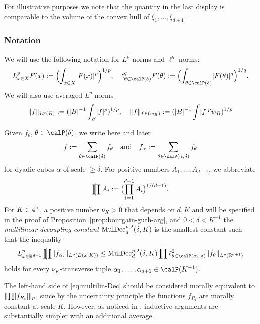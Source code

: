 For illustrative purposes we note that the quantity in the last display is comparable to the volume of the convex hull of $\xi_{1},\dotsc,\xi_{d+1}$.

\subsubsection{Notation}
We will use the following notation for $L^{p}$ norms and $\ell^{q}$ norms:
\[
L^{p}_{x\in X} F(x) := \Bigl( \int_{x\in X} \abs{F(x)}^{p} \Bigr)^{1/p},
\quad
\ell^{q}_{\theta \in \Part{\delta}} F(\theta) := \Bigl( \int_{\theta \in \Part{\delta}} \abs{F(\theta)}^{q} \Bigr)^{1/q}.
\]
We will also use averaged $L^{p}$ norms
\[
\norm{f}_{\avL^{p}(B)}:=(\abs{B}^{-1} \int_B \abs{f}^p )^{1/p},
\quad
\norm{f}_{\avL^{p}(w_B)}:=(\abs{B}^{-1} \int \abs{f}^p w_B)^{1/p}
\]

Given $f_{\theta}$, $\theta\in\Part{\delta}$, we write here and later
\[
f := \sum_{\theta\in\Part{\delta}} f_{\theta}
\quad\text{and}\quad
f_{\alpha} := \sum_{\theta \in \Part[\alpha]{\delta}} f_{\theta}
\]
for dyadic cubes $\alpha$ of scale $\geq \delta$.
For positive numbers $A_1, \dotsc, A_{d+1}$, we abbreviate
\[
\avprod A_{i} := \bigl(\prod_{i=1}^{d+1} A_{i}\bigr)^{1/(d+1)}.
\]
For $K \in 4^{\mathbb{N}}$, a positive number $\nu_{K}>0$ that depends on $d,K$ and will be specified in the proof of Proposition~\ref{prop:bourgain-guth-arg}, and $0 < \delta < K^{-1}$ the \emph{multilinear decoupling constant} $\mathrm{MulDec}^{p,2}_{d}(\delta, K)$ is the smallest constant such that the inequality
\begin{equation}
\label{eq:multilin-Dec}
L^{p}_{x\in\R^{d+1}} \avprod \norm{ f_{\alpha_{i}} }_{\avL^{p}(B(x,K))}
\le \MulDec^{p,2}_{d}(\delta, K)
\avprod \ell^{2}_{\theta \in \Part[\alpha_i]{\delta}} \norm{f_\theta}_{L^p(\R^{d+1})}
\end{equation}
holds for every $\nu_{K}$-transverse tuple $\alpha_{1},\dotsc,\alpha_{d+1} \in \Part{K^{-1}}$.

The left-hand side of \eqref{eq:multilin-Dec} should be considered morally equivalent to $\norm{ \avprod \abs{f_{R_{i}}}}_{p}$, since by the uncertainty principle the functions $f_{R_{i}}$ are morally constant at scale $K$.
However, as noticed in \cite{MR3592159}, inductive arguments are substantially simpler with an additional average.


